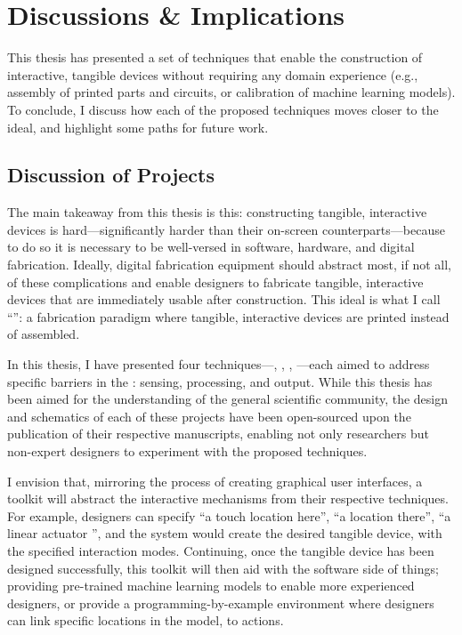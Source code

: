 \chapter{Discussions \& Implications} \label{ch:discussion}
  This thesis has presented a set of techniques that enable the construction of
  interactive, tangible devices without requiring any domain experience (e.g.,
  assembly of printed parts and circuits, or calibration of machine learning
  models). To conclude, I discuss how each of the proposed techniques moves
  closer to the \papf ideal, and highlight some paths for future work.

  \section{Discussion of Projects}
    The main takeaway from this thesis is this: constructing tangible,
    interactive devices is hard---significantly harder than their on-screen
    counterparts---because to do so it is necessary to be well-versed in
    software, hardware, and digital fabrication. Ideally, digital fabrication
    equipment should abstract most, if not all, of these complications and
    enable designers to fabricate tangible, interactive devices that are
    immediately usable after construction. This ideal  is what I
    call ``\papf'': a fabrication paradigm where tangible, interactive devices
    are printed instead of assembled.

    In this thesis, I have presented four \pap techniques---\al, \bh, \al,
    \mp---each aimed to address specific barriers in the : sensing, processing, and output. While this thesis has been aimed
    for the understanding of the general scientific community, the design and
    schematics of each of these projects have been open-sourced upon the
    publication of their respective manuscripts, enabling not only researchers
    but non-expert designers to experiment with the proposed techniques.

    I envision that, mirroring the process of creating graphical user
    interfaces, a \papf toolkit will abstract the interactive mechanisms from
    their respective techniques. For example, designers can specify ``a touch
    location here'', ``a \bh location there'', ``a linear actuator '',
    and the system would create the desired tangible device, with the specified
    interaction modes. Continuing, once the tangible device has been designed
    successfully, this toolkit will then aid with the software side of things;
    providing pre-trained machine learning models to enable more experienced
    designers, or provide a programming-by-example environment where designers
    can link specific locations in the model, to actions.

